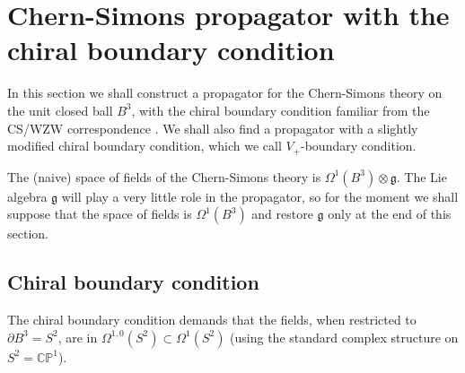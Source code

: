 \documentclass[a4paper]{amsart}
\theoremstyle{plain}
\theoremstyle{definition}
\newcommand{\g}{\mathfrak{g}}
\newcommand{\CP}{\mathbb{CP}^1}
\newcommand{\cf}{\mathsf{Conf}}
\begin{document}
	
	

\section{Chern-Simons propagator with the chiral boundary condition}

In this section we shall construct a propagator for the Chern-Simons theory on the unit closed ball $B^3$, with the chiral boundary condition familiar from the CS/WZW correspondence \cite{W}. We shall also find a propagator with a slightly modified chiral boundary condition, which we call $V_+$-boundary condition.

The (naive) space of fields of the Chern-Simons theory is $\Omega^1(B^3)\otimes\g$. The Lie algebra $\g$ will play a very little role in the propagator, so for the moment we shall suppose that the space of fields is $\Omega^1(B^3)$ and restore $\g$ only at the  end of this section.

\subsection{Chiral boundary condition}
The chiral boundary condition demands that the fields, when restricted to $\partial B^3 = S^2$, are in $\Omega^{1,0}(S^2)\subset\Omega^1(S^2)$ (using the standard complex structure on $S^2=\CP$). 
\end{document}
